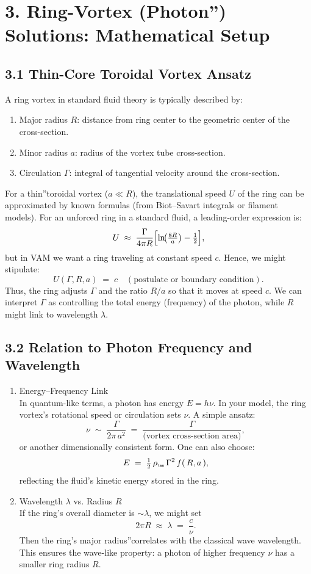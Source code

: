 \documentclass[a4paper,12pt]{article}
\begin{document}
\section*{3. Ring-Vortex (\grqq Photon\textquotedblright) Solutions: Mathematical Setup}
\subsection*{3.1 Thin-Core Toroidal Vortex Ansatz}
A ring vortex in standard fluid theory is typically described by:
\begin{enumerate}
 \item Major radius \(R\): distance from ring center to the geometric center of the cross-section.
 \item Minor radius \(a\): radius of the vortex tube cross-section.
 \item Circulation \(\Gamma\): integral of tangential velocity around the cross-section.
\end{enumerate}
For a \grqq thin\textquotedblright toroidal vortex (\(a \ll R\)), the translational speed \(U\) of the ring can be approximated by known formulas (from Biot–Savart integrals or filament models). For an unforced ring in a standard fluid, a leading-order expression is:
\[
 U \;\approx\; \frac{\Gamma}{4\pi R} \Bigl[\ln\!\bigl(\tfrac{8R}{a}\bigr) - \tfrac12\Bigr],
\]
but in VAM we want a ring traveling at constant speed \(c\). Hence, we might stipulate:
\[
 U(\Gamma, R, a) \;=\; c \quad (\text{postulate or boundary condition}).
\]
Thus, the ring adjusts \(\Gamma\) and the ratio \(R/a\) so that it moves at speed \(c\). We can interpret \(\Gamma\) as controlling the total energy (frequency) of the photon, while \(R\) might link to wavelength \(\lambda\).

\subsection*{3.2 Relation to Photon Frequency and Wavelength}
\begin{enumerate}
 \item Energy–Frequency Link\\
 In quantum-like terms, a photon has energy \(E = h\nu\). In your model, the ring vortex's rotational speed or circulation sets \(\nu\). A simple ansatz:
 \[
  \nu \;\sim\; \frac{\Gamma}{2\pi\,a^2} \;=\; \frac{\Gamma}{\text{(vortex cross-section area)}},
 \]
 or another dimensionally consistent form. One can also choose:
 \[
  E \;=\; \tfrac12\,\rho_{\scriptscriptstyle \mathrm{\ae}} \,\Gamma^2\,f(\,R,a\,),
 \]
 reflecting the fluid's kinetic energy stored in the ring.

 \item Wavelength \(\lambda\) vs. Radius \(R\)\\
 If the ring's overall diameter is \(\sim \lambda\), we might set
 \[
  2\pi R \;\approx\; \lambda \;=\; \frac{c}{\nu}.
 \]
 Then the ring's \grqq major radius\textquotedblright correlates with the classical wave wavelength. This ensures the wave-like property: a photon of higher frequency \(\nu\) has a smaller ring radius \(R\).
\end{enumerate}
\end{document}
